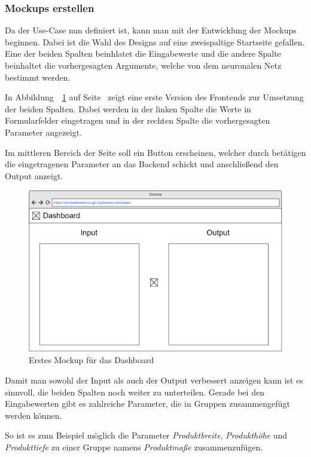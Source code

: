 \subsubsection{Mockups erstellen}
Da der Use-Case nun definiert ist, kann man mit der Entwicklung der Mockups beginnen. Dabei ist die Wahl des Designs auf
eine zweispaltige Startseite gefallen. Eine der beiden Spalten beinhlatet die Eingabewerte und die andere Spalte
beinhaltet die vorhergesagten Argumente, welche von dem neuronalen Netz bestimmt werden.

In Abbildung~~\ref{fig:umsetzung_mockup_scale_1} auf Seite~\pageref{fig:umsetzung_mockup_scale_1} zeigt eine erste
Version des Frontends zur Umsetzung der beiden Spalten. Dabei werden in der linken Spalte die Werte in Formularfelder
eingetragen und in der rechten Spalte die vorhergesagten Parameter angezeigt.

Im mittleren Bereich der Seite soll ein Button erscheinen, welcher durch betätigen die eingetragenen Parameter an das
Backend schickt und anschließend den Output anzeigt.

\begin{figure}[h]
    \centering
    \includegraphics[width=\textwidth]{images/kapitel_4/mockup_scale_1.png}
    \caption{Erstes Mockup für das Dashboard}
    \label{fig:umsetzung_mockup_scale_1}
\end{figure}

Damit man sowohl der Input als auch der Output verbessert anzeigen kann ist es sinnvoll, die beiden Spalten noch weiter
zu unterteilen. Gerade bei den Eingabewerten gibt es zahlreiche Parameter, die in Gruppen zusammengefügt werden können.

So ist es zum Beispiel möglich die Parameter \textit{Produktbreite}, \textit{Produkthöhe} und \textit{Produkttiefe} zu
einer Gruppe namens \textit{Produktmaße} zusammenzufügen.

